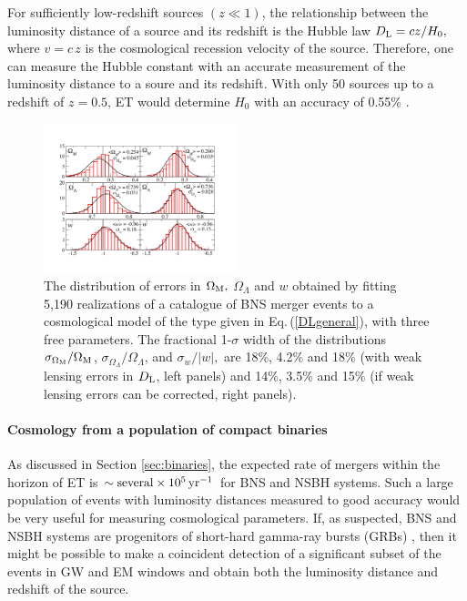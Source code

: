 For sufficiently low-redshift sources $(z\ll 1)$, the relationship 
between the luminosity distance of a source and its redshift is 
the Hubble law $D_{\rm L}=c z/H_0,$  where $v=c\,z$ is the cosmological 
recession velocity of the source. Therefore, one can measure the Hubble 
constant with an accurate measurement of the luminosity distance to a 
soure and its redshift.  With only 50 sources up to a redshift 
of $z = 0.5$, ET would determine $H_0 $ with an accuracy of 0.55\%
\cite{Sathyaprakash2009}.

\begin{figure}
\vskip-0.5cm
\includegraphics[width=0.5\textwidth]{./Sec_ET_ScienceCase/3params_combined.pdf}
\caption{
The distribution of errors in $\Omega_{\rm M},$
$\Omega_{\Lambda}$ and $w$ obtained by fitting 5,190
realizations of a catalogue of BNS merger events to a
cosmological model of the type given in
Eq.\,(\ref{DLgeneral}), with three free parameters.
The fractional 1-$\sigma$ width of the distributions
$\sigma_{\Omega_{\rm M}}/\Omega_{\rm M}$,
$\sigma_{\Omega_{\Lambda}}/\Omega_{\Lambda}$, and
$\sigma_w/|w|,$ are 18\%, 4.2\% and 18\%
(with weak lensing errors in $D_{\rm L}$, left panels)
and 14\%, 3.5\% and 15\% (if weak lensing
errors can be corrected, right panels).}
\vskip-0.5cm
\label{fig:fits}
\end{figure}
\paragraph{Cosmology from a population of compact binaries} 
As discussed in Section \ref{sec:binaries}, the expected rate 
of mergers within the horizon of ET is $\sim {\rm several}\times 
10^5\,\rm yr^{-1}$ for BNS and NSBH systems.
Such a large population of events with
luminosity distances measured to good accuracy
would be very useful for measuring cosmological parameters.
If, as suspected, BNS and NSBH systems are progenitors of short-hard
gamma-ray bursts (GRBs) \cite{2006ApJ...640..849N}, then it might be possible
to make a coincident detection of a significant subset of
the events in GW and EM windows and obtain
both the luminosity distance and redshift of the source.

